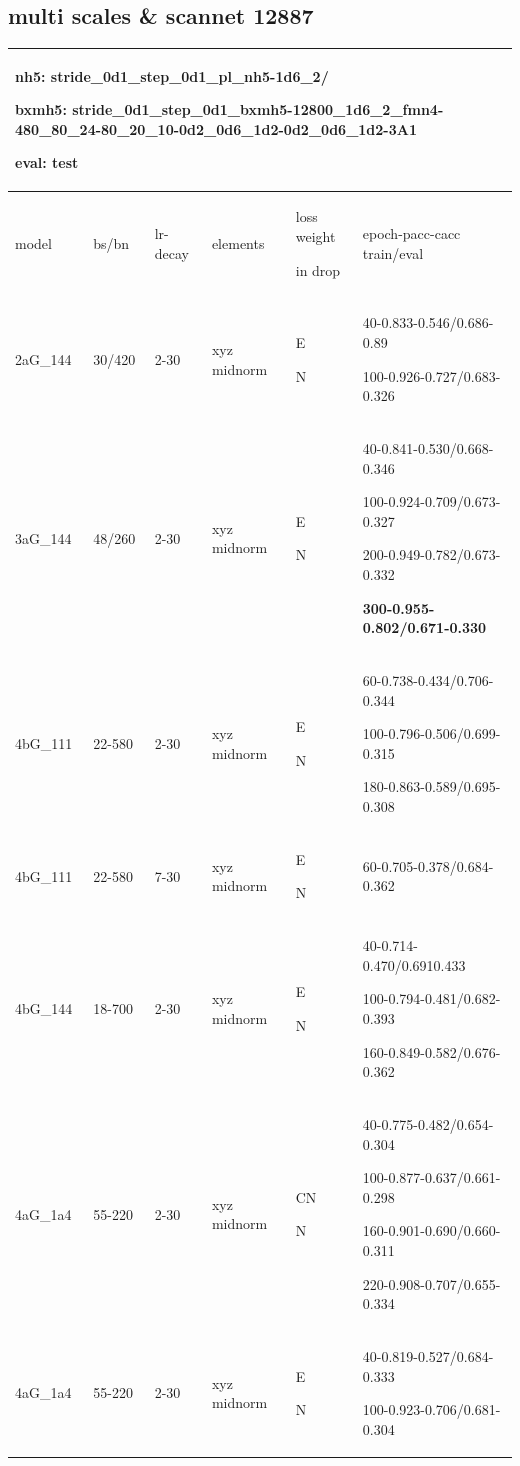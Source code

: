 \documentclass[,table,dvipsnames]{article}
\begin{document}
\subsection{multi scales \& scannet 12887}
\begin{tabular}{|p{1.5cm}|p{1cm}|p{1cm}|p{2cm}|p{1cm}||p{5cm}| }
	\hline
	\multicolumn{6}{|p{12cm}|}{nh5: stride\_0d1\_step\_0d1\_pl\_nh5-1d6\_2/ \par bxmh5:  stride\_0d1\_step\_0d1\_bxmh5-12800\_1d6\_2\_fmn4-480\_80\_24-80\_20\_10-0d2\_0d6\_1d2-0d2\_0d6\_1d2-3A1
	\par eval: test } \\		
	\hline
	model & bs/bn& lr-decay & elements & loss weight\par in drop & epoch-pacc-cacc train/eval \\
	\hline
	2aG\_144 & 30/420 &2-30 & xyz midnorm & E\par N &40-0.833-0.546/0.686-0.89 \par 100-0.926-0.727/0.683-0.326\\
	\hline
	3aG\_144 & 48/260 &2-30 & xyz midnorm & E\par N &40-0.841-0.530/0.668-0.346 \par 100-0.924-0.709/0.673-0.327\par 200-0.949-0.782/0.673-0.332 \par \textbf{300-0.955-0.802/0.671-0.330} \\
	\hline 
	4bG\_111 & 22-580 & 2-30 & xyz midnorm & E \par N &60-0.738-0.434/0.706-0.344 \par 100-0.796-0.506/0.699-0.315\par 180-0.863-0.589/0.695-0.308 \\
	\hline
	4bG\_111 & 22-580 & 7-30 & xyz midnorm & E \par N &60-0.705-0.378/0.684-0.362 \\
	\hline
	4bG\_144 & 18-700 & 2-30 & xyz midnorm & E \par N &40-0.714-0.470/0.6910.433\par 100-0.794-0.481/0.682-0.393\par 160-0.849-0.582/0.676-0.362 \\
	\hline
	4aG\_1a4 & 55-220 & 2-30 & xyz midnorm & CN \par N &40-0.775-0.482/0.654-0.304\par 100-0.877-0.637/0.661-0.298\par 160-0.901-0.690/0.660-0.311 \par 220-0.908-0.707/0.655-0.334\\
	\hline
	4aG\_1a4 & 55-220 & 2-30 & xyz midnorm & E \par N &40-0.819-0.527/0.684-0.333\par 100-0.923-0.706/0.681-0.304\\
	

\end{tabular}
\end{document}
